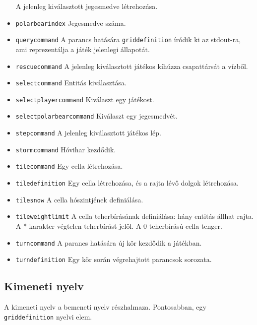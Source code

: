\begin{itemize}
A jelenleg kiválasztott jegesmedve létrehozása.
\item \texttt{polarbear\textunderscore{}index}
Jegesmedve száma.
\item \texttt{query\textunderscore{}command}
A parancs hatására \texttt{grid\textunderscore{}definition} íródik ki az stdout-ra, ami reprezentálja a játék jelenlegi állapotát.
\item \texttt{rescue\textunderscore{}command}
A jelenleg kiválasztott játékos kíhúzza csapattársát a vízből.
\item \texttt{select\textunderscore{}command}
Entitás kiválasztása.
\item \texttt{select\textunderscore{}player\textunderscore{}command}
Kiválaszt egy játékost.
\item \texttt{select\textunderscore{}polarbear\textunderscore{}command}
Kiválaszt egy jegesmedvét.
\item \texttt{step\textunderscore{}command}
A jelenleg kiválasztott játékos lép.
\item \texttt{storm\textunderscore{}command}
Hóvihar kezdődik.
\item \texttt{tile\textunderscore{}command}
Egy cella létrehozása.
\item \texttt{tile\textunderscore{}definition}
Egy cella létrehozása, és a rajta lévő dolgok létrehozása.
\item \texttt{tile\textunderscore{}snow}
A cella hószintjének definiálása.
\item \texttt{tile\textunderscore{}weight\textunderscore{}limit}
A cella teherbírásának definiálása: hány entitás állhat rajta. \newline A * karakter végtelen teherbírást jelöl. A 0 teherbírású cella tenger.
\item \texttt{turn\textunderscore{}command}
A parancs hatására új kör kezdődik a játékban.
\item \texttt{turn\textunderscore{}definition}
Egy kör során végrehajtott parancsok sorozata.
\end{itemize}


\subsection{Kimeneti nyelv}
A kimeneti nyelv a bemeneti nyelv részhalmaza. Pontosabban, egy  \texttt{grid\textunderscore{}definition} nyelvi elem.

